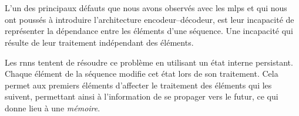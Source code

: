 \section{}
\label{sec.rnn}

L'un des principaux défauts que nous avons observés avec les \glspl{mlp} 
et qui nous ont poussés à introduire l'architecture encodeur--décodeur,
est leur incapacité de représenter la dépendance entre les éléments d'une séquence.
Une incapacité qui résulte de leur traitement indépendant des éléments.

Les \glspl{rnn} tentent de résoudre ce problème en utilisant un état interne persistant.
Chaque élément de la séquence modifie cet état lors de son traitement.
Cela permet aux premiers éléments d'affecter le traitement des éléments qui les suivent, 
permettant ainsi à l'information de se propager vers le futur,
ce qui donne lieu à une \emph{mémoire}.
